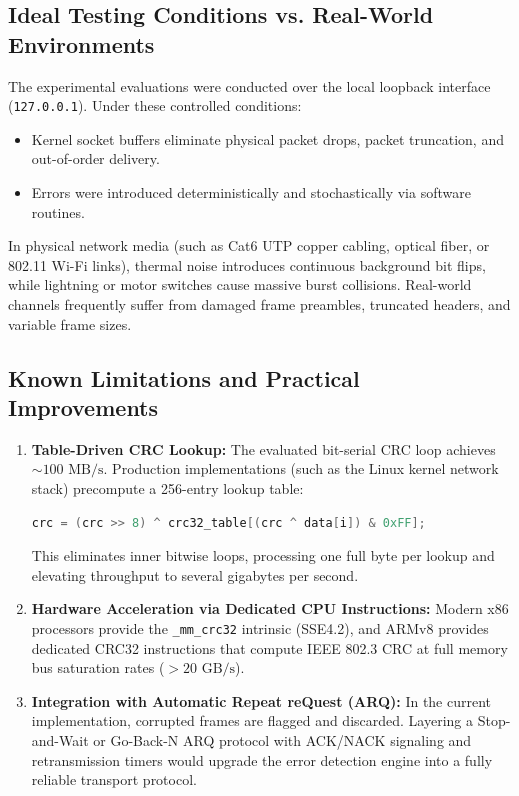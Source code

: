 \documentclass[11pt,a4paper]{article}
\begin{document}
\subsection{Ideal Testing Conditions vs. Real-World Environments}

The experimental evaluations were conducted over the local loopback interface (\texttt{127.0.0.1}). Under these controlled conditions:
\begin{itemize}
    \item Kernel socket buffers eliminate physical packet drops, packet truncation, and out-of-order delivery.
    \item Errors were introduced deterministically and stochastically via software routines.
\end{itemize}
In physical network media (such as Cat6 UTP copper cabling, optical fiber, or 802.11 Wi-Fi links), thermal noise introduces continuous background bit flips, while lightning or motor switches cause massive burst collisions. Real-world channels frequently suffer from damaged frame preambles, truncated headers, and variable frame sizes.

\subsection{Known Limitations and Practical Improvements}

\begin{enumerate}
    \item \textbf{Table-Driven CRC Lookup:} The evaluated bit-serial CRC loop achieves $\sim 100\text{ MB/s}$. Production implementations (such as the Linux kernel network stack) precompute a 256-entry lookup table:
    \begin{lstlisting}[language=C]
    crc = (crc >> 8) ^ crc32_table[(crc ^ data[i]) & 0xFF];
    \end{lstlisting}
    This eliminates inner bitwise loops, processing one full byte per lookup and elevating throughput to several gigabytes per second.
    \item \textbf{Hardware Acceleration via Dedicated CPU Instructions:} Modern x86 processors provide the \texttt{\_mm\_crc32} intrinsic (SSE4.2), and ARMv8 provides dedicated CRC32 instructions that compute IEEE 802.3 CRC at full memory bus saturation rates ($> 20\text{ GB/s}$).
    \item \textbf{Integration with Automatic Repeat reQuest (ARQ):} In the current implementation, corrupted frames are flagged and discarded. Layering a Stop-and-Wait or Go-Back-N ARQ protocol with ACK/NACK signaling and retransmission timers would upgrade the error detection engine into a fully reliable transport protocol.
\end{enumerate}
\end{document}
